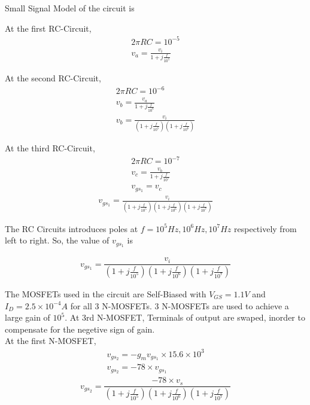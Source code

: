 \begin{enumerate}[label=\thesubsection.\arabic*.,ref=\thesubsection.\theenumi]
Small Signal Model of the circuit is
\begin{figure}[ht!]
	\begin{center}
		\resizebox{\columnwidth/1}{!}{}
	\end{center}
	\caption{}
	\label{fig:Circuit}
\end{figure}

At the first RC-Circuit,
\begin{align}
2\pi RC = 10^{-5}\\
v_{a} = \frac{v_{i}}{1 + j\frac{f}{10^{5}}}
\end{align}

At the second RC-Circuit,
\begin{align}
2\pi RC = 10^{-6}\\
v_{b} = \frac{v_{a}}{1 + j\frac{f}{10^{6}}}\\
v_{b} = \frac{v_{i}}{(1 + j\frac{f}{10^{5}})(1 + j\frac{f}{10^{6}})}
\end{align}

At the third RC-Circuit,
\begin{align}
2\pi RC = 10^{-7}\\
v_{c} = \frac{v_{b}}{1 + j\frac{f}{10^{7}}}\\
v_{gs_{1}} = v_{c}
\end{align}
\begin{align}
v_{gs_{1}} = \frac{v_{i}}{(1 + j\frac{f}{10^{5}})(1 + j\frac{f}{10^{6}})(1 + j\frac{f}{10^{7}})}
\end{align}

The RC Circuits introduces poles at $f=10^{5} Hz, 10^{6} Hz, 10^{7} Hz$ respectively from left to right. So, the value of $v_{gs_{1}}$ is

\begin{align}
v_{gs_{1}} = \dfrac{v_{i}}{\left(1+j\frac{f}{10^{5}}\right)\left(1+j\frac{f}{10^{6}}\right)\left(1+j\frac{f}{10^{7}}\right)}
\end{align}

The MOSFETs used in the circuit are Self-Biased with $V_{GS} = 1.1V$ and $I_{D}=2.5\times 10^{-4} A$ for all 3 N-MOSFETs. 3 N-MOSFETs are used to achieve a large gain of $10^{5}$. At 3rd N-MOSFET, Terminals of output are swaped, inorder to compensate for the negetive sign of gain.\\

At the first N-MOSFET,
\begin{align}
v_{gs_{2}} = -g_{m}v_{gs_{1}}\times 15.6\times 10^{3}\\
v_{gs_{2}} = -78\times v_{gs_{1}}
\end{align}
\begin{align}
v_{gs_{2}} = \dfrac{-78\times v_{s}}{\left(1+j\frac{f}{10^{5}}\right)\left(1+j\frac{f}{10^{6}}\right)\left(1+j\frac{f}{10^{7}}\right)}
\end{align}


\end{enumerate}
